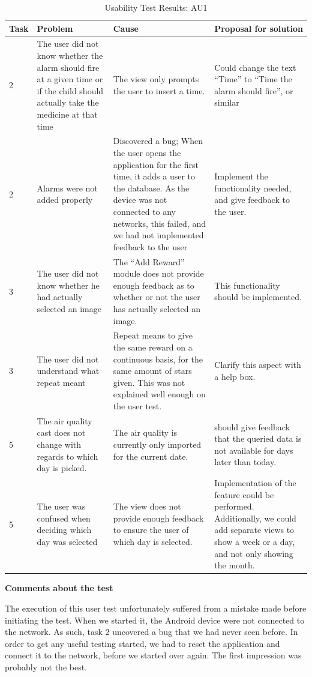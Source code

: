 \begin{table}[H]
\centering
\begin{tabular}{| p{0.8cm} | p{3.0cm} | p{5.0cm} | p{4.2cm} |}
\hline
	\textbf{Task} & \textbf{Problem} & \textbf{Cause} & \textbf{Proposal for solution} \\
	\hline
	2 & The user did not know whether the alarm should fire at a given time or if the child should actually take the medicine at that time  & The view only prompts the user to insert a time. & Could change the text ``Time'' to ``Time the alarm should fire'', or similar \\
	\hline
	2 & Alarms were not added properly & Discovered a bug; When the user opens the application for the first time, it adds a user to the database. As the device was not connected to any networks, this failed, and we had not implemented feedback to the user & Implement the functionality needed, and give feedback to the user.  \\
	\hline
	3 & The user did not know whether he had actually selected an image & The ``Add Reward'' module does not provide enough feedback as to whether or not the user has actually selected an image. & This functionality should be implemented.  \\
	\hline
	3 & The user did not understand what repeat meant & Repeat means to give the same reward on a continuous basis, for the same amount of stars given. This was not explained well enough on the user test.  & Clarify this aspect with a help box.   \\
	\hline
	5 & The air quality cast does not change with regards to which day is picked. & The air quality is currently only imported for the current date. & \app{} should give feedback that the queried data is not available for days later than today. \\ 
	\hline
	5 & The user was confused when deciding which day was selected & The view does not provide enough feedback to ensure the user of which day is selected. & Implementation of the feature could be performed. Additionally, we could add separate views to show a week or a day, and not only showing the month. \\
	\hline  
\end{tabular}
\caption{Usability Test Results: AU1}
\label{tab:testadult2}
\end{table}



\textbf{Comments about the test}

The execution of this user test unfortunately suffered from a mistake made before initiating the test. When we started it, the Android device were not connected to the network. As such, task 2 uncovered a bug that we had never seen before. In order to get any useful testing started, we had to reset the application and connect it to the network, before we started over again. The first impression was probably not the best.   


